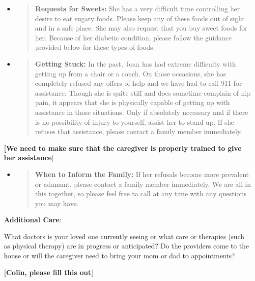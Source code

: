\documentclass[]{article}
\begin{document}
\begin{itemize}
\item
  \begin{quote}
  \textbf{Requests for Sweets:} She has a very difficult time
  controlling her desire to eat sugary foods. Please keep any of these
  foods out of sight and in a safe place. She may also request that you
  buy sweet foods for her. Because of her diabetic condition, please
  follow the guidance provided below for these types of foods.
  \end{quote}
\end{itemize}

\begin{itemize}
\item
  \begin{quote}
  \textbf{Getting Stuck:} In the past, Joan has had extreme difficulty
  with getting up from a chair or a couch. On those occasions, she has
  completely refused any offers of help and we have had to call 911 for
  assistance. Though she is quite stiff and does sometime complain of
  hip pain, it appears that she is physically capable of getting up with
  assistance in those situations. Only if absolutely necessary and if
  there is no possibility of injury to yourself, assist her to stand up.
  If she refuses that assistance, please contact a family member
  immediately.
  \end{quote}
\end{itemize}

\textbf{{[}We need to make sure that the caregiver is properly trained
to give her assistance{]}}

\begin{itemize}
\item
  \begin{quote}
  \textbf{When to Inform the Family:} If her refusals become more
  prevalent or adamant, please contact a family member immediately. We
  are all in this together, so please feel free to call at any time with
  any questions you may have.
  \end{quote}
\end{itemize}

\textbf{Additional Care}:

What doctors is your loved one currently seeing or what care or
therapies (such as physical therapy) are in progress or anticipated? Do
the providers come to the house or will the caregiver need to bring your
mom or dad to appointments?

\textbf{{[}Colin, please fill this out{]}}
\end{document}
